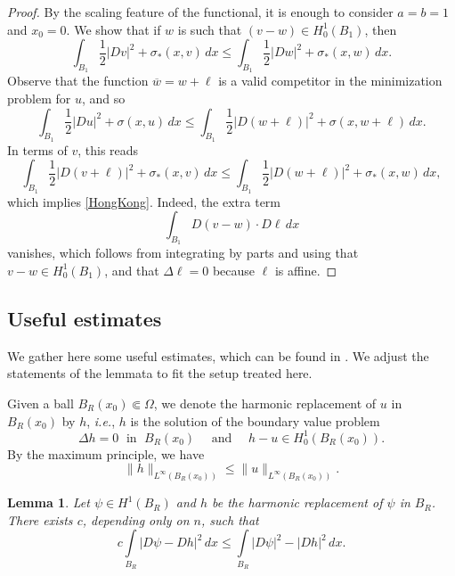 \documentclass[reqno,11pt]{amsart}
\newtheorem{lemma}{Lemma}[section]
\newcommand{\1}{\mathds{1}}  %
\numberwithin{equation}{section}
\begin{document}
\begin{proof}
By the scaling feature of the functional, it is enough to consider $a=b=1$ and $x_0 = 0$. We show that if $w$ is such that $(v-w) \in H^1_0(B_1)$, then 
\begin{equation} \label{HongKong}
    \int_{B_1} \frac{1}{2}|Dv|^2 + \sigma_{\ast}(x,v)\,dx \leq \int_{B_1} \frac{1}{2}|Dw|^2 + \sigma_{\ast}(x,w)\,dx.
\end{equation}
Observe that the function $\overline{w} = w + \ell$ is a valid competitor in the minimization problem for $u$, and so
$$
    \int_{B_1}\frac{1}{2}|Du|^2 + \sigma(x,u)\,dx \leq \int_{B_1}\frac{1}{2}|D(w + \ell)|^2 + \sigma(x,w + \ell)\,dx.
$$
In terms of $v$, this reads
$$
    \int_{B_1}\frac{1}{2}|D(v + \ell)|^2 + \sigma_{\ast}(x,v)\,dx \leq \int_{B_1}\frac{1}{2}|D(w + \ell)|^2 + \sigma_{\ast}(x,w)\,dx,
$$
which implies \eqref{HongKong}. Indeed, the extra term
$$
    \int_{B_1}D(v-w) \cdot D\ell\, dx
$$
vanishes, which follows from integrating by parts and using that $v - w \in H^1_0(B_1)$, and that $\Delta \ell = 0$ because $\ell$ is affine. 
\end{proof}

\subsection{Useful estimates}

We gather here some useful estimates, which can be found in \cite[Lemma 2.4 and Lemma 4.1, respectively]{LQT}. We adjust the statements of the lemmata to fit the setup treated here. 

Given a ball $B_R(x_0) \Subset \Omega$, we denote the harmonic replacement of $u$ in $B_R(x_0)$ by $h$, \textit{i.e.}, $h$ is the solution of the boundary value problem
$$
	\Delta h=0 \; \text{ in }\; B_R(x_0)  \quad \text{ and } \quad h-u \in H^1_0(B_R(x_0)).
$$ 
By the maximum principle, we have
\begin{equation}\label{harmonic}
\|h\|_{L^\infty(B_R(x_0))} \leq \|u\|_{L^{\infty}(B_R(x_0))}.
\end{equation}

\begin{lemma}\label{ineq for harmonic replac}
Let $\psi \in H^1(B_R)$ and $h$ be the harmonic replacement of $\psi$ in $B_R$. There exists $c$, depending only on $n$, such that 
\begin{equation}
c\int\limits_{B_R}|D\psi-Dh|^2 \, dx \leq \int\limits_{B_R}|D\psi|^2-|Dh|^2 \, dx. 
\end{equation}
\end{lemma}
\end{document}
